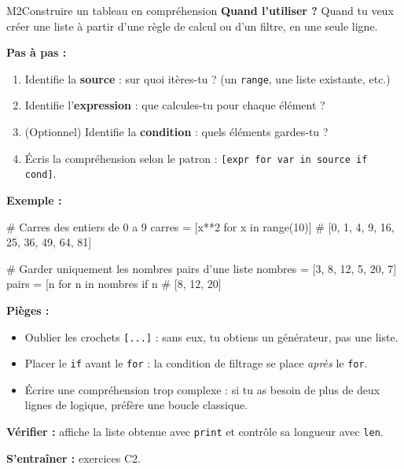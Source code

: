 \begin{fichemethode}{M2}{Construire un tableau en compréhension}
\textbf{Quand l'utiliser ?} Quand tu veux créer une liste à partir d'une règle de calcul ou d'un filtre, en une seule ligne.

\textbf{Pas à pas :}
\begin{enumerate}
  \item Identifie la \textbf{source} : sur quoi itères-tu ? (un \lstinline{range}, une liste existante, etc.)
  \item Identifie l'\textbf{expression} : que calcules-tu pour chaque élément ?
  \item (Optionnel) Identifie la \textbf{condition} : quels éléments gardes-tu ?
  \item Écris la compréhension selon le patron : \lstinline{[expr for var in source if cond]}.
\end{enumerate}

\textbf{Exemple :}
\begin{python}
# Carres des entiers de 0 a 9
carres = [x**2 for x in range(10)]
# [0, 1, 4, 9, 16, 25, 36, 49, 64, 81]

# Garder uniquement les nombres pairs d'une liste
nombres = [3, 8, 12, 5, 20, 7]
pairs = [n for n in nombres if n %
# [8, 12, 20]
\end{python}

\textbf{Pièges :}
\begin{itemize}
  \item Oublier les crochets \lstinline{[...]} : sans eux, tu obtiens un générateur, pas une liste.
  \item Placer le \lstinline{if} avant le \lstinline{for} : la condition de filtrage se place \emph{après} le \lstinline{for}.
  \item Écrire une compréhension trop complexe : si tu as besoin de plus de deux lignes de logique, préfère une boucle classique.
\end{itemize}

\textbf{Vérifier :} affiche la liste obtenue avec \lstinline{print} et contrôle sa longueur avec \lstinline{len}.

\textbf{S'entraîner :} exercices C2.
\end{fichemethode}
